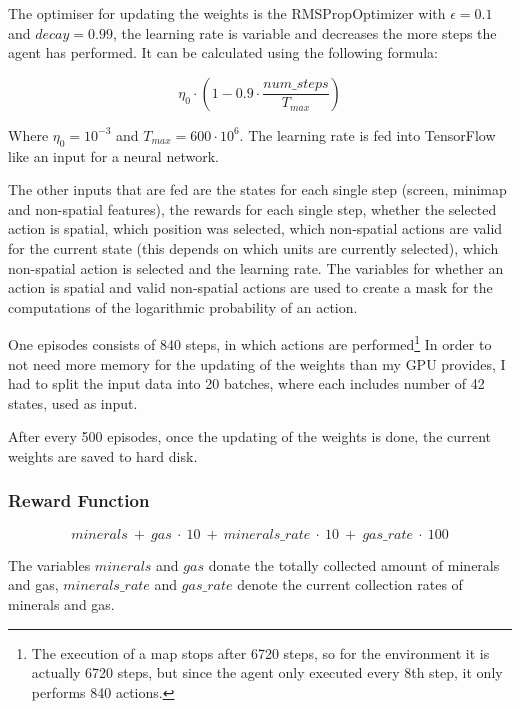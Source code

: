 \documentclass{article}
\begin{document}
The optimiser for updating the weights is the RMSPropOptimizer \cite{RMSPROP} 
with $\epsilon = 0.1$ and $decay = 0.99$, the learning rate is variable and 
decreases the more steps the agent has performed. It can be calculated using 
the following formula:

\begin{equation}
\eta_0 \cdot \left(1 - 0.9 \cdot 
\frac{num\_steps}{T_{max}}\right)
\end{equation}

Where $\eta_0 = 10^{-3}$ and $T_{max} = 600 \cdot 10^6$.  The learning rate is 
fed into TensorFlow like an input for a neural network.

The other inputs that are fed are the states for each single step (screen, 
minimap and non-spatial features), the rewards for each single step, whether 
the selected action is spatial, which position was selected, which non-spatial 
actions are valid for the current state (this depends on which units 
are currently selected), which non-spatial action is selected and the learning 
rate. The variables for whether an action is spatial and valid non-spatial 
actions are used to create a mask for the computations of the logarithmic 
probability of an action.

One episodes consists of 840 steps, in which actions are performed\footnote{The 
execution of a map stops after 6720 steps, so for the environment it is 
actually 6720 steps, but since the agent only executed every 8th step, it only 
performs 840 actions.} In order to not need more memory for the updating of the 
weights than my GPU provides, I had to split the input data into 20 batches, 
where each includes number of 42 states, used as input.

After every 500 episodes, once the updating of the weights is done, the current 
weights are saved to hard disk.

\subsubsection{Reward Function}
\label{rewards}
\begin{equation}
minerals\ +\ gas\ \cdot\ 10\ +\ minerals\_rate\ \cdot\ 10\ +\ gas\_rate\ \cdot\ 
100
\end{equation}

The variables $minerals$ and $gas$ donate the totally collected amount of 
minerals and gas, $minerals\_rate$ and $gas\_rate$ denote the current 
collection rates of minerals and gas.
\end{document}
